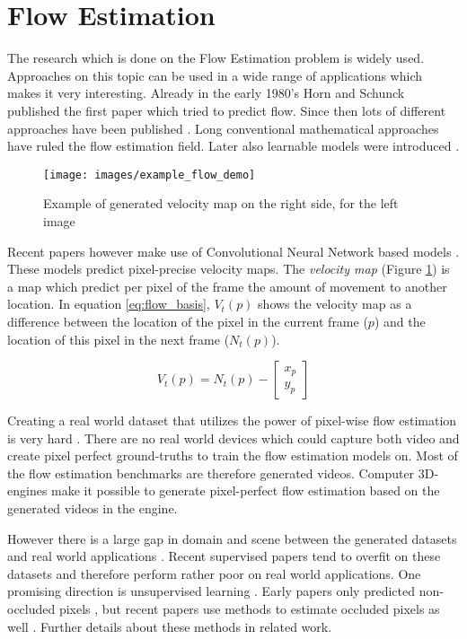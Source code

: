 \section{Flow Estimation}
The research which is done on the Flow Estimation problem is widely used. Approaches on this topic can be used in a wide range of applications which makes it very interesting. Already in the early 1980's Horn and Schunck \cite{Horn1981} published the first paper which tried to predict flow. Since then lots of different approaches have been published \cite{Memin1998, Bruhn2005, Brox2014}. Long conventional mathematical approaches have ruled the flow estimation field. Later also learnable models were introduced \cite{Pock2008, Wedel2009}.

\begin{figure}[h]
\centering
\texttt{[image: images/example\_flow\_demo]}
\caption{Example of generated velocity map on the right side, for the left image}
\label{fig:flow_map}
\end{figure}


Recent papers however make use of Convolutional Neural Network based models \cite{Dosovitskiy2015, ilg_flownet_2016, sun_pwc-net_2018, Ranjan2017, Hui2018}. These models predict pixel-precise velocity maps. The \emph{velocity map} (Figure \ref{fig:flow_map}) is a map which predict per pixel of the frame the amount of movement to another location. In equation \ref{eq:flow_basis}, $V_t(p)$ shows the velocity map as a difference between the location of the pixel in the current frame ($p$) and the location of this pixel in the next frame ($N_t(p)$).

\begin{equation}
\label{eq:flow_basis}
V_t(p) = N_t(p) - \begin{bmatrix} x_{p} \\ y_{p} \end{bmatrix}
\end{equation}

Creating a real world dataset that utilizes the power of pixel-wise flow estimation is very hard \cite{Dosovitskiy2015}. There are no real world devices which could capture both video and create pixel perfect ground-truths to train the flow estimation models on. Most of the flow estimation benchmarks are therefore generated videos. Computer 3D-engines make it possible to generate pixel-perfect flow estimation based on the generated videos in the engine.

However there is a large gap in domain and scene between the generated datasets and real world applications \cite{Liu2008}. Recent supervised papers \cite{Dosovitskiy2015, sun_pwc-net_2018} tend to overfit on these datasets and therefore perform rather poor on real world applications. One promising direction is unsupervised learning \cite{Yu2016, Janai2018, liu_ddflow_2019, liu_selflow_2019}. Early papers only predicted non-occluded pixels \cite{Yu2016, Janai2018}, but recent papers use methods to estimate occluded pixels as well \cite{liu_ddflow_2019, liu_selflow_2019}. Further details about these methods in related work.




